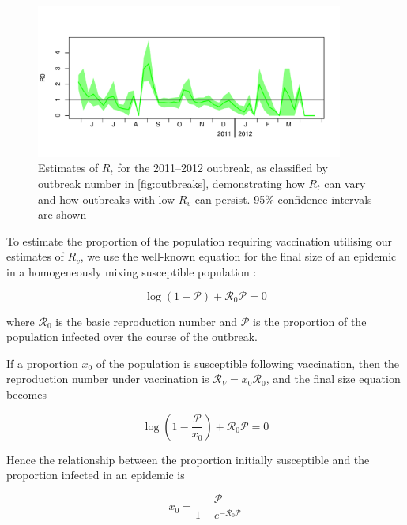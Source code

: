 \documentclass{article}
\newcommand{\Pe}{\mathcal{P}}
\newcommand{\Ro}{\mathcal{R}_0}
\newcommand{\Rr}{\mathcal{R}}
\begin{document}
\begin{figure}
\begin{center}
     \includegraphics[width=0.9\textwidth]{R0_outbreak33.pdf}
     \end{center}
     \caption{Estimates of $R_t$ for the 2011--2012 outbreak, as classified by outbreak number in \autoref{fig:outbreaks}, demonstrating how  $R_t$ can vary and how outbreaks with low  $R_v$ can persist. 95\% confidence intervals are shown}
     \label{fig:r0_2011}
\end{figure}

To estimate the proportion of the population requiring vaccination utilising our estimates of $R_v$, we use the well-known equation for the final size of an epidemic in a homogeneously mixing susceptible population \citep{diekmann13}:

\begin{equation} \label{eq:eqn1}
\log\left(1-\Pe\right)+\Ro\Pe=0
\end{equation}

where $\Ro$ is the basic reproduction number and $\Pe$ is the proportion of the population infected over the course of the outbreak.

If a proportion $x_0$ of the population is susceptible following vaccination, then the  reproduction number under vaccination is $\Rr_V=x_0\Ro$, and the final size equation becomes

\begin{equation} \label{eq:eqn2}
\log\left(1-\frac{\Pe}{x_0}\right)+\Ro\Pe=0
\end{equation}

Hence the relationship between the proportion initially susceptible and the proportion infected in an epidemic is

\begin{equation} \label{eq:eqn3}
x_0=\frac{\Pe}{1-e^{-\Ro\Pe}}
\end{equation}
\end{document}
